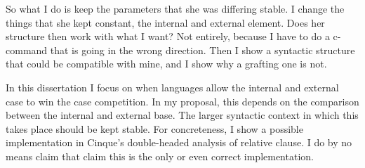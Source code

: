 So what I do is keep the parameters that she was differing stable. I change the things that she kept constant, the internal and external element. Does her structure then work with what I want? Not entirely, because I have to do a c-command that is going in the wrong direction.
Then I show a syntactic structure that could be compatible with mine, and I show why a grafting one is not.



In this dissertation I focus on when languages allow the internal and external case to win the case competition. In my proposal, this depends on the comparison between the internal and external base. The larger syntactic context in which this takes place should be kept stable. For concreteness, I show a possible implementation in Cinque's double-headed analysis of relative clause. I do by no means claim that claim this is the only or even correct implementation.



